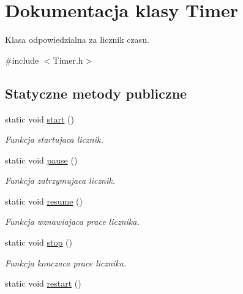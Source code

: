 \hypertarget{class_timer}{}\section{Dokumentacja klasy Timer}
\label{class_timer}


Klasa odpowiedzialna za licznik czasu.  




{\ttfamily \#include $<$Timer.\+h$>$}

\subsection*{Statyczne metody publiczne}
\begin{DoxyCompactItemize}
\item 
\hypertarget{class_timer_a3a8b5272198d029779dc9302a54305a8}{}static void \hyperlink{class_timer_a3a8b5272198d029779dc9302a54305a8}{start} ()\label{class_timer_a3a8b5272198d029779dc9302a54305a8}

\begin{DoxyCompactList}\small\item\em Funkcja startujaca licznik. \end{DoxyCompactList}\item 
\hypertarget{class_timer_ab2a6e0b9d6b9c93c06c89ff6dd6291c1}{}static void \hyperlink{class_timer_ab2a6e0b9d6b9c93c06c89ff6dd6291c1}{pause} ()\label{class_timer_ab2a6e0b9d6b9c93c06c89ff6dd6291c1}

\begin{DoxyCompactList}\small\item\em Funkcja zatrzymujaca licznik. \end{DoxyCompactList}\item 
\hypertarget{class_timer_a4ac55a73bb3431db9d4d2fd70ae9a2e8}{}static void \hyperlink{class_timer_a4ac55a73bb3431db9d4d2fd70ae9a2e8}{resume} ()\label{class_timer_a4ac55a73bb3431db9d4d2fd70ae9a2e8}

\begin{DoxyCompactList}\small\item\em Funkcja wznawiajaca prace licznika. \end{DoxyCompactList}\item 
\hypertarget{class_timer_a63f0eb44b27402196590a03781515dba}{}static void \hyperlink{class_timer_a63f0eb44b27402196590a03781515dba}{stop} ()\label{class_timer_a63f0eb44b27402196590a03781515dba}

\begin{DoxyCompactList}\small\item\em Funkcja konczaca prace licznika. \end{DoxyCompactList}\item 
\hypertarget{class_timer_aa3f7871196bb56202af2bc982bfbfff6}{}static void \hyperlink{class_timer_aa3f7871196bb56202af2bc982bfbfff6}{restart} ()\label{class_timer_aa3f7871196bb56202af2bc982bfbfff6}


\end{DoxyCompactItemize}
